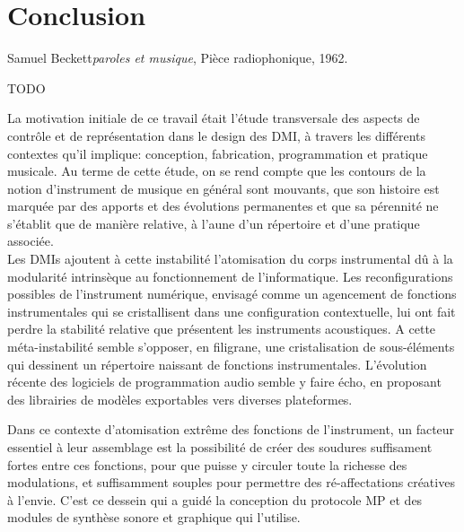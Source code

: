 %
\chapter{Conclusion}
\label{ch:conclusion}

{Samuel Beckett}{\textit{paroles et musique}, Pièce radiophonique, 1962. \cite{beckett_comeet_2014}}

TODO

\noindent La motivation initiale de ce travail était l'étude transversale des aspects de contrôle et de représentation dans le design des \gls{DMI}, à travers les différents contextes qu'il implique: conception, fabrication, programmation et pratique musicale. Au terme de cette étude, on se rend compte que les contours de la notion d'instrument de musique en général sont mouvants, que son histoire est marquée par des apports et des évolutions permanentes et que sa pérennité ne s'établit que de manière relative, à l'aune d'un répertoire et d'une pratique associée.\\

\indent Les \glspl{DMI} ajoutent à cette instabilité l'atomisation du corps instrumental dû à la modularité intrinsèque au fonctionnement de l'informatique. Les reconfigurations possibles de l'instrument numérique, envisagé comme un agencement de fonctions instrumentales qui se cristallisent dans une configuration contextuelle, lui ont fait perdre la stabilité relative que présentent les instruments acoustiques. A cette méta-instabilité semble s'opposer, en filigrane, une cristalisation de sous-éléments qui dessinent un répertoire naissant de fonctions instrumentales. 
L'évolution récente des logiciels de programmation audio semble y faire écho, en proposant des librairies de modèles exportables vers diverses plateformes.

Dans ce contexte d'atomisation extrême des fonctions de l'instrument, un facteur essentiel à leur assemblage est la possibilité de créer des soudures suffisament fortes entre ces fonctions, pour que puisse y circuler toute la richesse des modulations, et suffisamment souples pour permettre des ré-affectations créatives à l'envie. C'est ce dessein qui a guidé la conception du protocole MP et des modules de synthèse sonore et graphique qui l'utilise.

